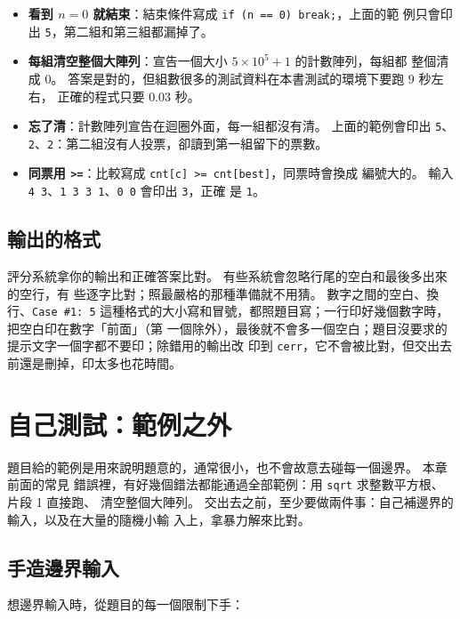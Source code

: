 \begin{itemize}
\item \textbf{看到 $n = 0$ 就結束}：結束條件寫成 \texttt{if (n == 0) break;}，上面的範
例只會印出 \texttt{5}，第二組和第三組都漏掉了。
\item \textbf{每組清空整個大陣列}：宣告一個大小 $5 \times 10^5 + 1$ 的計數陣列，每組都
整個清成 $0$。 答案是對的，但組數很多的測試資料在本書測試的環境下要跑 $9$ 秒左右，
正確的程式只要 $0.03$ 秒。
\item \textbf{忘了清}：計數陣列宣告在迴圈外面，每一組都沒有清。 上面的範例會印出
\texttt{5}、\texttt{2}、\texttt{2}：第二組沒有人投票，卻讀到第一組留下的票數。
\item \textbf{同票用 \texttt{>=}}：比較寫成 \texttt{cnt[c] >= cnt[best]}，同票時會換成
編號大的。 輸入 \texttt{4 3}、\texttt{1 3 3 1}、\texttt{0 0} 會印出 \texttt{3}，正確
是 \texttt{1}。
\end{itemize}

\subsection{輸出的格式}

評分系統拿你的輸出和正確答案比對。 有些系統會忽略行尾的空白和最後多出來的空行，有
些逐字比對；照最嚴格的那種準備就不用猜。 數字之間的空白、換行、\texttt{Case \#1: 5}
這種格式的大小寫和冒號，都照題目寫；一行印好幾個數字時，把空白印在數字「前面」（第
一個除外），最後就不會多一個空白；題目沒要求的提示文字一個字都不要印；除錯用的輸出改
印到 \texttt{cerr}，它不會被比對，但交出去前還是刪掉，印太多也花時間。

\section{自己測試：範例之外}
\label{sec:testing}

題目給的範例是用來說明題意的，通常很小，也不會故意去碰每一個邊界。 本章前面的常見
錯誤裡，有好幾個錯法都能通過全部範例：用 \texttt{sqrt} 求整數平方根、片段 1 直接跑、
清空整個大陣列。 交出去之前，至少要做兩件事：自己補邊界的輸入，以及在大量的隨機小輸
入上，拿暴力解來比對。

\subsection{手造邊界輸入}

想邊界輸入時，從題目的每一個限制下手：

